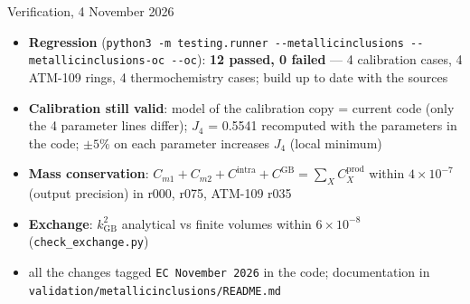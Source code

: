 \documentclass[aspectratio=169,10pt]{beamer}
\begin{document}
\begin{frame}{Verification, 4 November 2026}
  \small
  \begin{itemize}
    \item \textbf{Regression} (\texttt{python3 -m testing.runner -{}-metallicinclusions -{}-metallicinclusions-oc -{}-oc}):
      \textbf{12 passed, 0 failed} --- 4 calibration cases, 4 ATM-109 rings, 4 thermochemistry cases; build up to date with the sources
    \item \textbf{Calibration still valid}: model of the calibration copy = current code (only the 4 parameter lines differ);
      $J_4$ = 0.5541 recomputed with the parameters in the code; $\pm5\%$ on each parameter increases $J_4$ (local minimum)
    \item \textbf{Mass conservation}: $C_{m1} + C_{m2} + C^{\mathrm{intra}} + C^{\mathrm{GB}} = \sum_X C_X^{\mathrm{prod}}$ within
      $4\times10^{-7}$ (output precision) in r000, r075, ATM-109 r035
    \item \textbf{Exchange}: $k_{\mathrm{GB}}^2$ analytical vs finite volumes within $6\times10^{-8}$ (\texttt{check\_exchange.py})
    \item all the changes tagged \texttt{EC November 2026} in the code; documentation in \texttt{validation/metallicinclusions/README.md}
  \end{itemize}
\end{frame}
\end{document}
